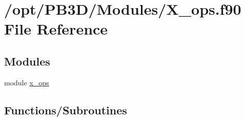 \hypertarget{X__ops_8f90}{}\section{/opt/\+P\+B3\+D/\+Modules/\+X\+\_\+ops.f90 File Reference}
\label{X__ops_8f90}
\subsection*{Modules}
\begin{DoxyCompactItemize}
\item 
module \hyperlink{namespacex__ops}{x\+\_\+ops}
\end{DoxyCompactItemize}
\subsection*{Functions/\+Subroutines}
